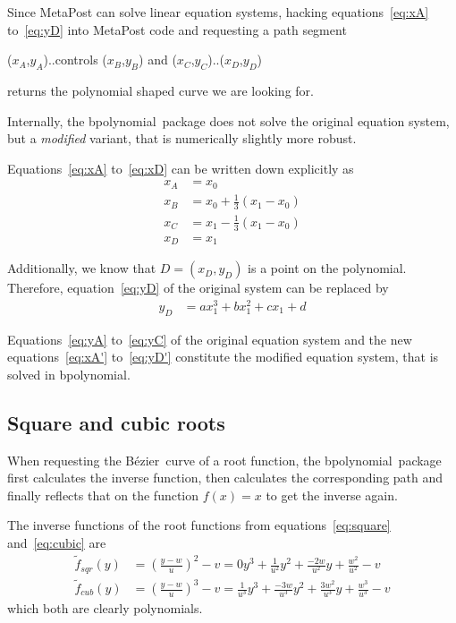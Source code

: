 \documentclass{article}
\newcommand*{\name}[1]{\textsf{#1}}
\newcommand*{\pkg}{\name{bpolynomial}}
\newcommand*{\B}{B\'ezier}
\begin{document}
Since MetaPost can solve linear equation systems, hacking equations~\ref{eq:xA} to~\ref{eq:yD} into MetaPost code and requesting a path segment
\begin{center}\ttfamily
  ($x_A$,$y_A$)..controls ($x_B$,$y_B$) and ($x_C$,$y_C$)..($x_D$,$y_D$)
\end{center}
returns the polynomial shaped curve we are looking for.

Internally, the \pkg\ package does not solve the original equation system, but a \emph{modified} variant, that is numerically slightly more robust.

Equations~\ref{eq:xA} to~\ref{eq:xD} can be written down explicitly as
\begin{align}
  x_A & = x_0 \label{eq:xA'} \\
  x_B & = x_0 + \frac{1}{3}(x_1-x_0) \label{eq:xB'} \\
  x_C & = x_1 - \frac{1}{3}(x_1-x_0) \label{eq:xC'} \\
  x_D & = x_1 \label{eq:xD'}
\end{align}

Additionally, we know that $D=(x_D,y_D)$ is a point on the polynomial.  Therefore, equation~\ref{eq:yD} of the original system can be replaced by
\begin{align}
  y_D & = ax_1^3 + bx_1^2 + cx_1 + d \label{eq:yD'}
\end{align}

Equations~\ref{eq:yA} to~\ref{eq:yC} of the original equation system and the new equations~\ref{eq:xA'} to~\ref{eq:yD'} constitute the modified equation system, that is solved in \pkg.

\subsection{Square and cubic roots}\label{app:roots}
When requesting the \B\ curve of a root function, the \pkg\ package first calculates the inverse function, then calculates the corresponding path and finally reflects that on the function $f(x)=x$ to get the inverse again.

The inverse functions of the root functions from equations~\ref{eq:square} and~\ref{eq:cubic} are
\begin{align}
  \widetilde f_{sqr}(y) & = \left(\frac{y-w}{u}\right)^2 - v = 0 y^3 + \frac{1}{u^2} y^2 + \frac{-2w}{u^2} y + \frac{w^2}{u^2} - v \\
  \widetilde f_{cub}(y) & = \left(\frac{y-w}{u}\right)^3 - v = \frac{1}{u^3} y^3 + \frac{-3w}{u^3} y^2 + \frac{3w^2}{u^3} y + \frac{w^3}{u^3} - v
\end{align}
which both are clearly polynomials.
\end{document}
